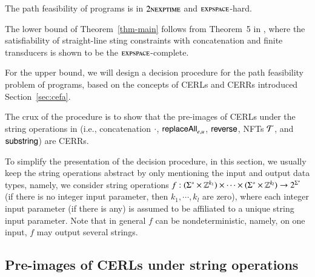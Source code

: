 

\begin{theorem}\label{thm-main}
The path feasibility of {\slint} programs is in $2\textsc{nexptime}$ and $\textsc{expspace}$-hard. 
\end{theorem}
%
The lower bound of Theorem~\ref{thm-main} follows from Theorem~5 in \cite{LB16}, where the satisfiability of straight-line sting constraints with concatenation and finite transducers is shown to be the $\textsc{expspace}$-complete.

For the upper bound, we will design a decision procedure for the path feasibility problem of {\slint} programs, based on the concepts of CERLs and CERRs introduced Section~\ref{sec:cefa}.


The crux of the procedure is to %
show that the %
pre-images of CERLs under the string operations in {\slint} (i.e., concatenation $\cdot$, $\mathsf{replaceAll}_{e,u}$, $\mathsf{reverse}$, NFTs $\mathcal{T}$, and $\mathsf{substring}$) are CERRs. 

To simplify the presentation of the decision procedure, in this section, we usually keep the string operations abstract by only mentioning the input and output data types, namely, we consider string operations $f: (\Sigma^* \times \mathbb{Z}^{k_1}) \times \cdots \times (\Sigma^* \times \mathbb{Z}^{k_l}) \rightarrow 2^{\Sigma^*}$ (if there is no integer input parameter, then $k_1,\cdots,k_l$ are zero), where each integer input parameter (if there is any) is assumed to be affiliated to a unique string input parameter. Note that  in general $f$ can be nondeterministic, namely, on one input, $f$ may output several  strings.


\subsection{Pre-images of CERLs under string operations}

